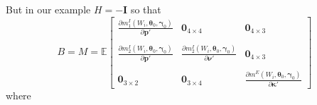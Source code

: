 \documentclass[12pt]{article}
\begin{document}
But in our example $H = -\mathbf{I}$ so that 
\[
  B = M = \mathbb{E}\left[
\begin{array}{ccc}
  \displaystyle \frac{\partial m_1^I(W_i, \boldsymbol{\theta}_0, \boldsymbol{\gamma}_0)}{\partial \mathbf{p}'} & \mathbf{0}_{4\times 4} & \mathbf{0}_{4 \times 3}\\ \\
  \displaystyle \frac{\partial m^I_2(W_i, \boldsymbol{\theta}_0, \boldsymbol{\gamma}_0)}{\partial \mathbf{p}'} &
\displaystyle \frac{\partial m^I_2(W_i, \boldsymbol{\theta}_0, \boldsymbol{\gamma}_0)}{\partial \boldsymbol{\nu}'} &
\mathbf{0}_{4\times 3} \\ \\
\mathbf{0}_{3 \times 2} & \mathbf{0}_{3\times 4} & 
\displaystyle \frac{\partial m^E\left( W_i, \boldsymbol{\theta}_0, \boldsymbol{\gamma}_0 \right)}{\partial \boldsymbol{\kappa}'}
\end{array}
\right]
\]
where 
\end{document}
